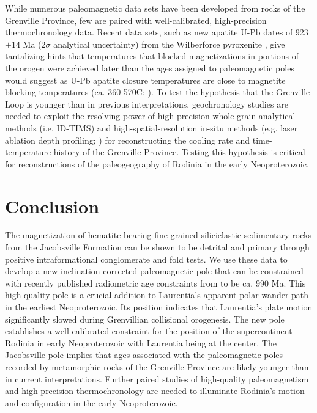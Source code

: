 \documentclass[draft]{agujournal2019}
\begin{document}
While numerous paleomagnetic data sets have been developed from rocks of the Grenville Province, few are paired with well-calibrated, high-precision thermochronology data. Recent data sets, such as new apatite U-Pb dates of 923$\pm$14 Ma (2$\sigma$ analytical uncertainty) from the Wilberforce pyroxenite \cite{Paul2021a}, give tantalizing hints that temperatures that blocked magnetizations in portions of the orogen were achieved later than the ages assigned to paleomagnetic poles would suggest as U-Pb apatite closure temperatures are close to magnetite blocking temperatures (ca. 360-570\textdegree C; ). To test the hypothesis that the Grenville Loop is younger than in previous interpretations, geochronology studies are needed to exploit the resolving power of high-precision whole grain analytical methods (i.e. ID-TIMS) and high-spatial-resolution in-situ methods (e.g. laser ablation depth profiling; ) for reconstructing the cooling rate and time-temperature history of the Grenville Province. Testing this hypothesis is critical for reconstructions of the paleogeography of Rodinia in the early Neoproterozoic. 

\section*{Conclusion}

The magnetization of hematite-bearing fine-grained siliciclastic sedimentary rocks from the Jacobsville Formation can be shown to be detrital and primary through positive intraformational conglomerate and fold tests. We use these data to develop a new inclination-corrected paleomagnetic pole that can be constrained with recently published radiometric age constraints from  to be ca. 990 Ma. This high-quality pole is a crucial addition to Laurentia's apparent polar wander path in the earliest Neoproterozoic. Its position indicates that Laurentia's plate motion significantly slowed during Grenvillian collisional orogenesis. The new pole establishes a well-calibrated constraint for the position of the supercontinent Rodinia in early Neoproterozoic with Laurentia being at the center. The Jacobsville pole implies that ages associated with the paleomagnetic poles recorded by metamorphic rocks of the Grenville Province are likely younger than in current interpretations. Further paired studies of high-quality paleomagnetism and high-precision thermochronology are needed to illuminate Rodinia's motion and configuration in the early Neoproterozoic. 
\end{document}
